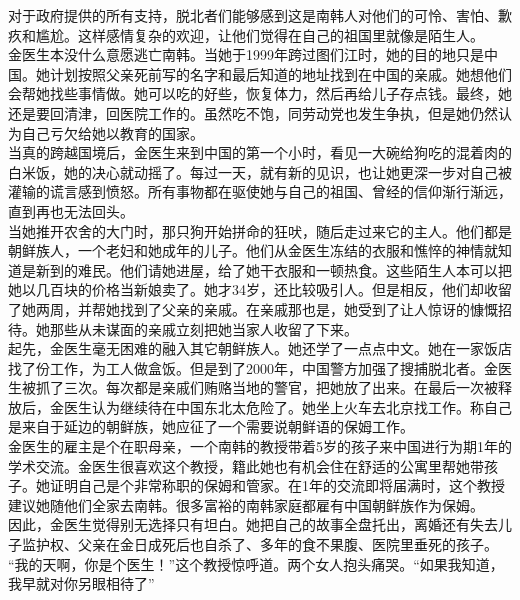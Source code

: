 对于政府提供的所有支持，脱北者们能够感到这是南韩人对他们的可怜、害怕、歉疚和尴尬。这样感情复杂的欢迎，让他们觉得在自己的祖国里就像是陌生人。\\

金医生本没什么意愿逃亡南韩。当她于1999年跨过图们江时，她的目的地只是中国。她计划按照父亲死前写的名字和最后知道的地址找到在中国的亲戚。她想他们会帮她找些事情做。她可以吃的好些，恢复体力，然后再给儿子存点钱。最终，她还是要回清津，回医院工作的。虽然吃不饱，同劳动党也发生争执，但是她仍然认为自己亏欠给她以教育的国家。\\

当真的跨越国境后，金医生来到中国的第一个小时，看见一大碗给狗吃的混着肉的白米饭，她的决心就动摇了。每过一天，就有新的见识，也让她更深一步对自己被灌输的谎言感到愤怒。所有事物都在驱使她与自己的祖国、曾经的信仰渐行渐远，直到再也无法回头。\\

当她推开农舍的大门时，那只狗开始拼命的狂吠，随后走过来它的主人。他们都是朝鲜族人，一个老妇和她成年的儿子。他们从金医生冻结的衣服和憔悴的神情就知道是新到的难民。他们请她进屋，给了她干衣服和一顿热食。这些陌生人本可以把她以几百块的价格当新娘卖了。她才34岁，还比较吸引人。但是相反，他们却收留了她两周，并帮她找到了父亲的亲戚。在亲戚那也是，她受到了让人惊讶的慷慨招待。她那些从未谋面的亲戚立刻把她当家人收留了下来。\\

起先，金医生毫无困难的融入其它朝鲜族人。她还学了一点点中文。她在一家饭店找了份工作，为工人做盒饭。但是到了2000年，中国警方加强了搜捕脱北者。金医生被抓了三次。每次都是亲戚们贿赂当地的警官，把她放了出来。在最后一次被释放后，金医生认为继续待在中国东北太危险了。她坐上火车去北京找工作。称自己是来自于延边的朝鲜族，她应征了一个需要说朝鲜语的保姆工作。\\

金医生的雇主是个在职母亲，一个南韩的教授带着5岁的孩子来中国进行为期1年的学术交流。金医生很喜欢这个教授，籍此她也有机会住在舒适的公寓里帮她带孩子。她证明自己是个非常称职的保姆和管家。在1年的交流即将届满时，这个教授建议她随他们全家去南韩。很多富裕的南韩家庭都雇有中国朝鲜族作为保姆。\\

因此，金医生觉得别无选择只有坦白。她把自己的故事全盘托出，离婚还有失去儿子监护权、父亲在金日成死后也自杀了、多年的食不果腹、医院里垂死的孩子。\\

“我的天啊，你是个医生！”这个教授惊呼道。两个女人抱头痛哭。“如果我知道，我早就对你另眼相待了”\\

